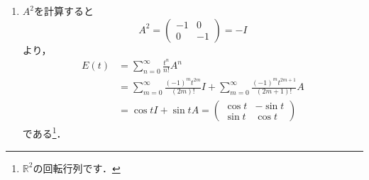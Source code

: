 \documentclass[a4paper,pdflatex,ja=standard]{bxjsarticle}
\begin{document}
\begin{enumerate}
  \item   
  $A^{2}$を計算すると
  \begin{equation}
    A^2
    =
    \begin{pmatrix}
      -1 & 0 \\
      0 & -1  
    \end{pmatrix}
    =
    -I
  \end{equation}
  より，
  \begin{align}
    E(t)
    &=
    \sum_{n=0}^{\infty}\frac{t^{n}}{n!}A^{n}
    \nonumber
    \\
    &=
    \sum_{m=0}^{\infty}\frac{(-1)^{m}t^{2m}}{(2m)!}I
    +
    \sum_{m=0}^{\infty}\frac{(-1)^{m}t^{2m+1}}{(2m+1)!}A
    \nonumber
    \\
    &=
    \cos t I + \sin t A
    =
    \begin{pmatrix}
      \cos t & -\sin t \\
      \sin t & \cos t
    \end{pmatrix}
  \end{align}
  である\footnote{$\mathbb{R}^2$の回転行列です．}．

\end{enumerate}
\end{document}
